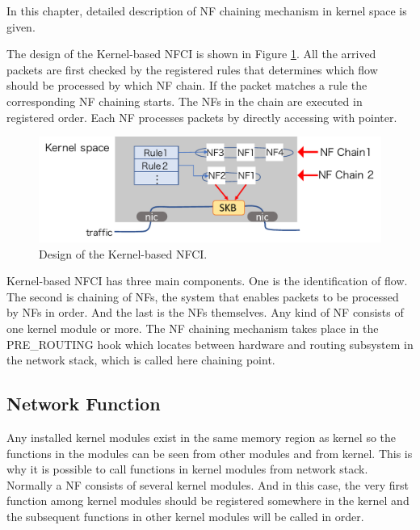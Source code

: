 In this chapter, detailed description of NF chaining mechanism in kernel space is given. 

The design of the Kernel-based NFCI is shown in Figure \ref{fig: design}. All the arrived packets are first checked by the registered rules that determines which flow should be processed by which NF chain. If the packet matches a rule the corresponding NF chaining starts. The NFs in the chain are executed in registered order. Each NF processes packets by directly accessing with pointer. 
 
 \begin{figure}
	\centering
	\includegraphics[width=120mm]{pics/design.pdf}
	\caption{Design of the Kernel-based NFCI.}
	\label{fig: design}
\end{figure}

Kernel-based NFCI has three main components. One is the identification of flow. The second is chaining of NFs, the system that enables packets to be processed by NFs in order. And the last is the NFs themselves. Any kind of NF consists of one kernel module or more. The NF chaining mechanism takes place in the PRE\_ROUTING hook which locates between hardware and routing subsystem in the network stack, which is called here chaining point. 

\subsection{Network Function}
Any installed kernel modules exist in the same memory region as kernel so the functions in the modules can be seen from other modules and from kernel. This is why it is possible to call functions in kernel modules from network stack. Normally a NF consists of several kernel modules. And in this case, the very first function among kernel modules should be registered somewhere in the kernel and the subsequent functions in other kernel modules will be called in order. 

